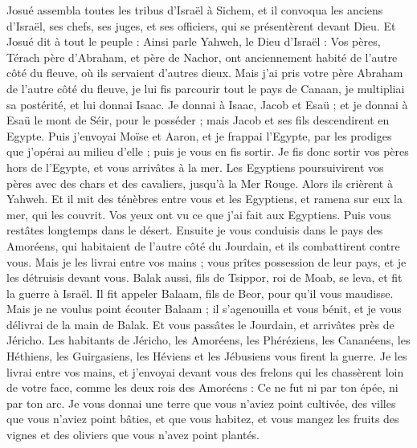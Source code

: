 \begin{multicols}{2}
\VerseOne{}Josué assembla toutes les tribus d'Israël à Sichem, et il convoqua les anciens d'Israël, ses chefs, ses juges, et ses officiers, qui se présentèrent devant Dieu.
Et Josué dit à tout le peuple : Ainsi parle Yahweh, le Dieu d'Israël : Vos pères, Térach père d'Abraham, et père de Nachor, ont anciennement habité de l'autre côté du fleuve, où ils servaient d'autres dieux.
Mais j'ai pris votre père Abraham de l'autre côté du fleuve, je lui fis parcourir tout le pays de Canaan, je multipliai sa postérité, et lui donnai Isaac.
Je donnai à Isaac, Jacob et Esaü ; et je donnai à Esaü le mont de Séir, pour le posséder ; mais Jacob et ses fils descendirent en Egypte.
Puis j'envoyai Moïse et Aaron, et je frappai l'Egypte, par les prodiges que j'opérai au milieu d'elle ; puis je vous en fis sortir.
Je fis donc sortir vos pères hors de l'Egypte, et vous arrivâtes à la mer. Les Egyptiens poursuivirent vos pères avec des chars et des cavaliers, jusqu'à la Mer Rouge.
Alors ils crièrent à Yahweh. Et il mit des ténèbres entre vous et les Egyptiens, et ramena sur eux la mer, qui les couvrit. Vos yeux ont vu ce que j'ai fait aux Egyptiens. Puis vous restâtes longtemps dans le désert.
Ensuite je vous conduisis dans le pays des Amoréens, qui habitaient de l'autre côté du Jourdain, et ils combattirent contre vous. Mais je les livrai entre vos mains ; vous prîtes possession de leur pays, et je les détruisis devant vous.
Balak aussi, fils de Tsippor, roi de Moab, se leva, et fit la guerre à Israël. Il fit appeler Balaam, fils de Beor, pour qu'il vous maudisse.
Mais je ne voulus point écouter Balaam ; il s'agenouilla et vous bénit, et je vous délivrai de la main de Balak.
Et vous passâtes le Jourdain, et arrivâtes près de Jéricho. Les habitants de Jéricho, les Amoréens, les Phéréziens, les Cananéens, les Héthiens, les Guirgasiens, les Héviens et les Jébusiens vous firent la guerre. Je les livrai entre vos mains,
et j'envoyai devant vous des frelons qui les chassèrent loin de votre face, comme les deux rois des Amoréens : Ce ne fut ni par ton épée, ni par ton arc.
Je vous donnai une terre que vous n'aviez point cultivée, des villes que vous n'aviez point bâties, et que vous habitez, et vous mangez les fruits des vignes et des oliviers que vous n'avez point plantés.

\end{multicols}
